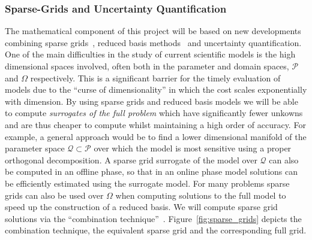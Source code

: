 \documentclass[a4paper,fontsize=12pt]{scrartcl}
\begin{document}





\subsubsection*{Sparse-Grids and Uncertainty Quantification}

The mathematical component of this project will be based on new
developments combining sparse
grids~\parencite{BungartzGriebel2004}, reduced basis
methods~\parencite{LiebermanEtal2010,Peherstorfer2013,ChenSchwab2015,PeherstorferWillcox2015}
and uncertainty quantification. One of the main difficulties in the
study of current scientific models is the high dimensional spaces
involved, often both in the parameter and domain spaces, $\mathcal{P}$
and $\Omega$ respectively. This is a significant barrier for the
timely evaluation of models due to the ``curse of dimensionality'' in
which the cost scales exponentially with dimension. By using sparse
grids and reduced basis models we will be able to compute
\emph{surrogates of the full problem} which have significantly fewer
unkowns and are thus cheaper to compute whilst maintaining a high
order of accuracy. For example, a general approach would be to find a
lower dimensional manifold of the parameter space
$\mathcal{Q}\subset\mathcal{P}$ over which the model is most sensitive
using a proper orthogonal decomposition. A sparse grid surrogate of
the model over $\mathcal{Q}$ can also be computed in an offline phase,
so that in an online phase model solutions can be efficiently
estimated using the surrogate model. For many problems sparse grids
can also be used over $\Omega$ when computing solutions to the full
model to speed up the construction of a reduced basis. We will compute
sparse grid solutions via the ``combination
technique''~\parencite{Griebel1990}. Figure~\ref{fig:sparse_grids}
depicts the combination technique, the equivalent sparse grid and the
corresponding full grid.
\end{document}
